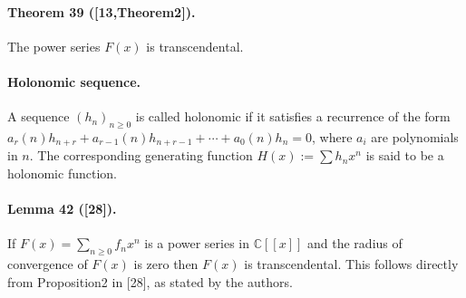 \paragraph{Theorem 39 ([13,Theorem2]).} The power series $F(x)$ is transcendental.
\paragraph{Holonomic sequence.} A sequence $(h_n)_{n\ge0}$ is called holonomic if it satisfies a recurrence of the form $a_r(n)h_{n+r}+a_{r-1}(n)h_{n+r-1}+\cdots+a_0(n)h_n=0$, where $a_i$ are polynomials in $n$. The corresponding generating function $H(x):=\sum h_nx^n$ is said to be a holonomic function.
\paragraph{Lemma 42 ([28]).} If $F(x)=\sum_{n\ge0}f_nx^n$ is a power series in $\mathbb C[[x]]$ and the radius of convergence of $F(x)$ is zero then $F(x)$ is transcendental. This follows directly from Proposition2 in [28], as stated by the authors.
